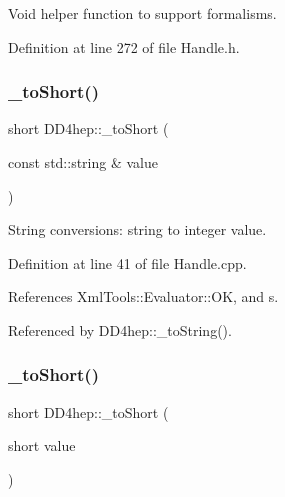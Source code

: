 Void helper function to support formalisms. 



Definition at line 272 of file Handle.\+h.

\hypertarget{group___d_d4_h_e_p___g_e_o_m_e_t_r_y_gaef47a03e8cfb41d0bc2d598c16b7b9f2}{}\label{group___d_d4_h_e_p___g_e_o_m_e_t_r_y_gaef47a03e8cfb41d0bc2d598c16b7b9f2} 
\subsubsection{\texorpdfstring{\+\_\+to\+Short()}{\_toShort()}\hspace{0.1cm}{\footnotesize\ttfamily [1/2]}}
{\footnotesize\ttfamily short D\+D4hep\+::\+\_\+to\+Short (\begin{DoxyParamCaption}\item[{const std\+::string \&}]{value }\end{DoxyParamCaption})}



String conversions\+: string to integer value. 



Definition at line 41 of file Handle.\+cpp.



References Xml\+Tools\+::\+Evaluator\+::\+OK, and s.



Referenced by D\+D4hep\+::\+\_\+to\+String().

\hypertarget{group___d_d4_h_e_p___g_e_o_m_e_t_r_y_ga08bead9e87f71537d8ef0eebb368b386}{}\label{group___d_d4_h_e_p___g_e_o_m_e_t_r_y_ga08bead9e87f71537d8ef0eebb368b386} 
\subsubsection{\texorpdfstring{\+\_\+to\+Short()}{\_toShort()}\hspace{0.1cm}{\footnotesize\ttfamily [2/2]}}
{\footnotesize\ttfamily short D\+D4hep\+::\+\_\+to\+Short (\begin{DoxyParamCaption}\item[{short}]{value }\end{DoxyParamCaption})\hspace{0.3cm}{\ttfamily [inline]}}



